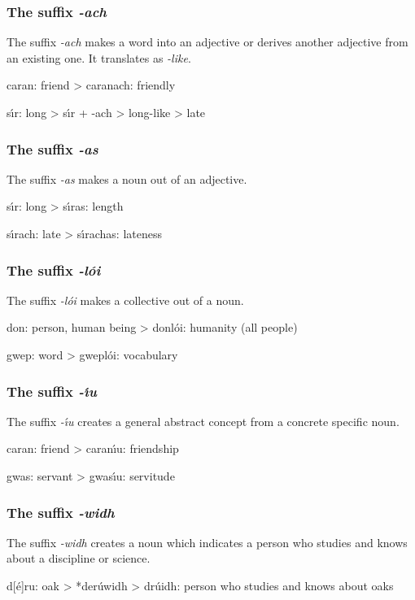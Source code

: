 \subsubsection{The suffix \textit{-ach}}

The suffix \textit{-ach} makes a word into an adjective or derives another adjective from an existing one. It translates as \textit{-like}.

caran: friend
> caranach: friendly

s\'{\i}r: long
> s\'{\i}r + -ach > long-like > late

\subsubsection{The suffix \textit{-as}}

The suffix \textit{-as} makes a noun out of an adjective.

s\'{\i}r: long
> s\'{\i}ras: length

s\'{\i}rach: late
> s\'{\i}rachas: lateness

\subsubsection{The suffix \textit{-l\'{o}i}}

The suffix \textit{-l\'{o}i} makes a collective out of a noun.

don: person, human being
> donl\'{o}i: humanity (all people)

gwep: word
> gwepl\'{o}i: vocabulary

\subsubsection{The suffix \textit{-\'{\i}u}}

The suffix \textit{-\'{\i}u} creates a general abstract concept from a concrete specific noun.

caran: friend
> caran\'{\i}u: friendship

gwas: servant
> gwas\'{\i}u: servitude

\subsubsection{The suffix \textit{-widh}}

The suffix \textit{-widh} creates a noun which indicates a person who studies and knows about a discipline or science.

d[\'{e}]ru: oak
> *der\'{u}widh > dr\'{u}idh: person who studies and knows about oaks

